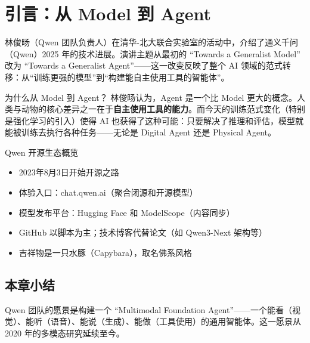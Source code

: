 \section{引言：从 Model 到 Agent}

林俊旸（Qwen 团队负责人）在清华-北大联合实验室的活动中，介绍了通义千问（Qwen）2025 年的技术进展。演讲主题从最初的 ``Towards a Generalist Model'' 改为 ``Towards a Generalist Agent''——这一改变反映了整个 AI 领域的范式转移：从``训练更强的模型''到``构建能自主使用工具的智能体''。

\begin{importantbox}{为什么从 Model 到 Agent？}
林俊旸认为，Agent 是一个比 Model 更大的概念。人类与动物的核心差异之一在于\textbf{自主使用工具的能力}。而今天的训练范式变化（特别是强化学习的引入）使得 AI 也获得了这种可能：只要解决了推理和评估，模型就能被训练去执行各种任务——无论是 Digital Agent 还是 Physical Agent。
\end{importantbox}

\begin{knowledgebox}{Qwen 开源生态概览}
\begin{itemize}
    \item 2023年8月3日开始开源之路
    \item 体验入口：chat.qwen.ai（聚合闭源和开源模型）
    \item 模型发布平台：Hugging Face 和 ModelScope（内容同步）
    \item GitHub 以脚本为主；技术博客代替论文（如 Qwen3-Next 架构等）
    \item 吉祥物是一只水豚（Capybara），取名佛系风格
\end{itemize}
\end{knowledgebox}

\subsection{本章小结}

Qwen 团队的愿景是构建一个 ``Multimodal Foundation Agent''——一个能看（视觉）、能听（语音）、能说（生成）、能做（工具使用）的通用智能体。这一愿景从 2020 年的多模态研究延续至今。

